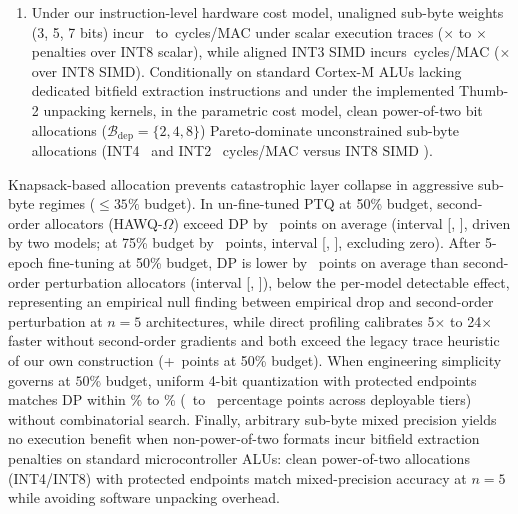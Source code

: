 \documentclass{ieeeaccess}
\begin{document}
\begin{enumerate}
    \item Under our instruction-level hardware cost model, unaligned sub-byte weights (3, 5, 7 bits) incur \MacroCyclesScalarUnpackLow\ to \MacroCyclesScalarUnpackHigh\,cycles/MAC under scalar execution traces (\MacroPenaltyScalarUnpackLow$\times$ to \MacroPenaltyScalarUnpackHigh$\times$ penalties over INT8 scalar), while aligned INT3 SIMD incurs \MacroCyclesINTThreeSIMD\,cycles/MAC (\MacroPenaltyINTThreeSIMD$\times$ over INT8 SIMD). Conditionally on standard Cortex-M ALUs lacking dedicated bitfield extraction instructions and under the implemented Thumb-2 unpacking kernels, in the parametric cost model, clean power-of-two bit allocations ($\mathcal{B}_{\text{dep}} = \{2, 4, 8\}$) Pareto-dominate unconstrained sub-byte allocations (INT4 \MacroCyclesFourBitSIMDExact\ and INT2 \MacroCyclesTwoBitSIMD\ cycles/MAC versus INT8 SIMD \MacroCyclesINTEightSIMDExact).
\end{enumerate}
Knapsack-based allocation prevents catastrophic layer collapse in aggressive sub-byte regimes ($\le 35\%$ budget). In un-fine-tuned PTQ at 50\% budget, second-order allocators (HAWQ-$\Omega$) exceed DP by \MacroPTQDPOmegaAbsMeanFifty\ points on average (interval [\MacroPTQDPOmegaCILowFifty, \MacroPTQDPOmegaCIHighFifty], driven by two models; at 75\% budget by \MacroPTQDPOmegaAbsMeanSeventyFive\ points, interval [\MacroPTQDPOmegaCILowSeventyFive, \MacroPTQDPOmegaCIHighSeventyFive], excluding zero). After 5-epoch fine-tuning at 50\% budget, DP is lower by \MacroOmegaAbsMeanDelta\ points on average than second-order perturbation allocators (interval [\MacroOmegaCILow, \MacroOmegaCIHigh]), below the per-model detectable effect, representing an empirical null finding between empirical drop and second-order perturbation at $n = 5$ architectures, while direct profiling calibrates 5$\times$ to 24$\times$ faster without second-order gradients and both exceed the legacy trace heuristic of our own construction (+\MacroLegacyMeanDelta\ points at 50\% budget). When engineering simplicity governs at $50\%$ budget, uniform 4-bit quantization with protected endpoints matches DP within \MacroDPUniformWFourMinFifty\% to \MacroDPUniformWFourMaxFifty\% (\MacroDPUniformWFourMinCombined\ to \MacroDPUniformWFourMaxCombined\ percentage points across deployable tiers) without combinatorial search. Finally, arbitrary sub-byte mixed precision yields no execution benefit when non-power-of-two formats incur bitfield extraction penalties on standard microcontroller ALUs: clean power-of-two allocations (INT4/INT8) with protected endpoints match mixed-precision accuracy at $n = 5$ while avoiding software unpacking overhead.
\end{document}
